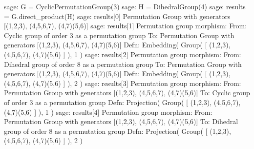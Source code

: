 \begin{sageexample}
sage: G = CyclicPermutationGroup(3)
sage: H = DihedralGroup(4)
sage: results = G.direct_product(H)
sage: results[0]
Permutation Group with generators [(1,2,3), (4,5,6,7), (4,7)(5,6)]
sage: results[1]
Permutation group morphism:
  From: Cyclic group of order 3 as a permutation group
  To:   Permutation Group with generators
        [(1,2,3), (4,5,6,7), (4,7)(5,6)]
  Defn: Embedding( Group( [ (1,2,3), (4,5,6,7), (4,7)(5,6) ] ), 1 )
sage: results[2]
Permutation group morphism:
  From: Dihedral group of order 8 as a permutation group
  To:   Permutation Group with generators
        [(1,2,3), (4,5,6,7), (4,7)(5,6)]
  Defn: Embedding( Group( [ (1,2,3), (4,5,6,7), (4,7)(5,6) ] ), 2 )
sage: results[3]
Permutation group morphism:
  From: Permutation Group with generators
        [(1,2,3), (4,5,6,7), (4,7)(5,6)]
  To:   Cyclic group of order 3 as a permutation group
  Defn: Projection( Group( [ (1,2,3), (4,5,6,7), (4,7)(5,6) ] ), 1 )
sage: results[4]
Permutation group morphism:
  From: Permutation Group with generators
        [(1,2,3), (4,5,6,7), (4,7)(5,6)]
  To:   Dihedral group of order 8 as a permutation group
  Defn: Projection( Group( [ (1,2,3), (4,5,6,7), (4,7)(5,6) ] ), 2 )
\end{sageexample}
%
\begin{sageverbatim}
\end{sageverbatim}
%
